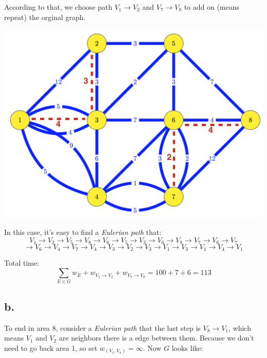 \documentclass{article}
\begin{document}
{{        According to that, we choose path \(\mathit{V}_{\mathrm{1}} \to \mathit{V}_{\mathrm{2}}\) and \(\mathit{V}_{\mathrm{7}} \to \mathit{V}_{\mathrm{8}}\) to add on (means repeat) the orginal graph.

        \begin{center}{
            \includegraphics[scale=0.6]{P10_2.png}
        }
        \end{center}

        In this case, it's easy to find a \textit{Eulerian path} that:
        \[\mathit{V}_{\mathrm{1}} \to \mathit{V}_{\mathrm{2}} \to \mathit{V}_{\mathrm{5}} \to \mathit{V}_{\mathrm{8}} \to \mathit{V}_{\mathrm{6}} \to \mathit{V}_{\mathrm{5}} \to \mathit{V}_{\mathrm{3}} \to \mathit{V}_{\mathrm{6}} \to \mathit{V}_{\mathrm{8}} \to \mathit{V}_{\mathrm{7}} \to \mathit{V}_{\mathrm{6}} \to \mathit{V}_{\mathrm{7}}\]
        \[\to \mathit{V}_{\mathrm{6}} \to \mathit{V}_{\mathrm{4}} \to \mathit{V}_{\mathrm{7}} \to \mathit{V}_{\mathrm{4}} \to \mathit{V}_{\mathrm{3}} \to \mathit{V}_{\mathrm{2}} \to \mathit{V}_{\mathrm{3}} \to \mathit{V}_{\mathrm{1}} \to \mathit{V}_{\mathrm{3}} \to \mathit{V}_{\mathrm{1}} \to \mathit{V}_{\mathrm{4}} \to \mathit{V}_{\mathrm{1}}\]

        Total time: 
        \[\sum_{\mathit{E}\in\mathit{G}}\mathit{w_E} + \mathit{w}_{\mathit{V}_{\mathrm{1}} \to \mathit{V}_{\mathrm{2}}} + \mathit{w}_{\mathit{V}_{\mathrm{7}} \to \mathit{V}_{\mathrm{8}}} = \mathrm{100 + 7 + 6 = 113}\]
    }
    \subsection*{b.}{
        To end in area 8, consider a \textit{Eulerian path} that the last step is \(\mathit{V}_{\mathrm{8}} \to \mathit{V}_{\mathrm{1}}\), which means \(\mathit{V}_{\mathrm{1}} \text{ and } \mathit{V}_{\mathrm{2}}\) are neighbors there is a edge between them. Because we don't need to go back area 1, so set \(\mathit{w}_{(\mathit{V}_{\mathrm{1}}, \mathit{V}_{\mathrm{8}})} = \infty \). Now \(\mathit{G}\) looks like:

}}
\end{document}
